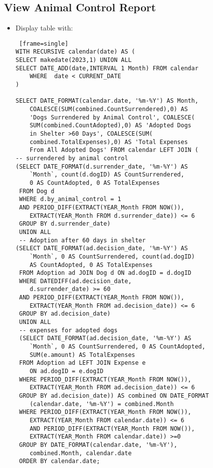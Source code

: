 \documentclass{article}
\begin{document}
\subsection{View Animal Control Report}
\begin{itemize}
\item Display table with:
\begin{itemize}
    \begin{Verbatim} [frame=single]
WITH RECURSIVE calendar(date) AS (
SELECT makedate(2023,1) UNION ALL 
SELECT DATE_ADD(date,INTERVAL 1 Month) FROM calendar 
    WHERE  date < CURRENT_DATE
)

SELECT DATE_FORMAT(calendar.date, '%m-%Y') AS Month, 
    COALESCE(SUM(combined.CountSurrendered),0) AS 
    'Dogs Surrendered by Animal Control', COALESCE(
    SUM(combined.CountAdopted),0) AS 'Adopted Dogs 
    in Shelter >60 Days', COALESCE(SUM(
    combined.TotalExpenses),0) AS 'Total Expenses 
    From All Adopted Dogs' FROM calendar LEFT JOIN (
-- surrendered by animal control
(SELECT DATE_FORMAT(d.surrender_date, '%m-%Y') AS 
    `Month`, count(d.dogID) AS CountSurrendered, 
    0 AS CountAdopted, 0 AS TotalExpenses
 FROM Dog d
 WHERE d.by_animal_control = 1
 AND PERIOD_DIFF(EXTRACT(YEAR_Month FROM NOW()), 
    EXTRACT(YEAR_Month FROM d.surrender_date)) <= 6
 GROUP BY d.surrender_date)
 UNION ALL
 -- Adoption after 60 days in shelter
(SELECT DATE_FORMAT(ad.decision_date, '%m-%Y') AS 
    `Month`, 0 AS CountSurrendered, count(ad.dogID) 
    AS CountAdopted, 0 AS TotalExpenses
 FROM Adoption ad JOIN Dog d ON ad.dogID = d.dogID
 WHERE DATEDIFF(ad.decision_date, 
    d.surrender_date) >= 60
 AND PERIOD_DIFF(EXTRACT(YEAR_Month FROM NOW()), 
    EXTRACT(YEAR_Month FROM ad.decision_date)) <= 6
 GROUP BY ad.decision_date)
 UNION ALL
 -- expenses for adopted dogs
 (SELECT DATE_FORMAT(ad.decision_date, '%m-%Y') AS 
    `Month`, 0 AS CountSurrendered, 0 AS CountAdopted, 
    SUM(e.amount) AS TotalExpenses
 FROM Adoption ad LEFT JOIN Expense e 
    ON ad.dogID = e.dogID
 WHERE PERIOD_DIFF(EXTRACT(YEAR_Month FROM NOW()), 
    EXTRACT(YEAR_Month FROM ad.decision_date)) <= 6
 GROUP BY ad.decision_date)) AS combined ON DATE_FORMAT
    (calendar.date, '%m-%Y') = combined.Month
 WHERE PERIOD_DIFF(EXTRACT(YEAR_Month FROM NOW()), 
    EXTRACT(YEAR_Month FROM calendar.date)) <= 6 
    AND PERIOD_DIFF(EXTRACT(YEAR_Month FROM NOW()), 
    EXTRACT(YEAR_Month FROM calendar.date)) >=0
 GROUP BY DATE_FORMAT(calendar.date, '%m-%Y'), 
    combined.Month, calendar.date
 ORDER BY calendar.date;
    \end{Verbatim}

\end{itemize}
\end{itemize}
\end{document}
